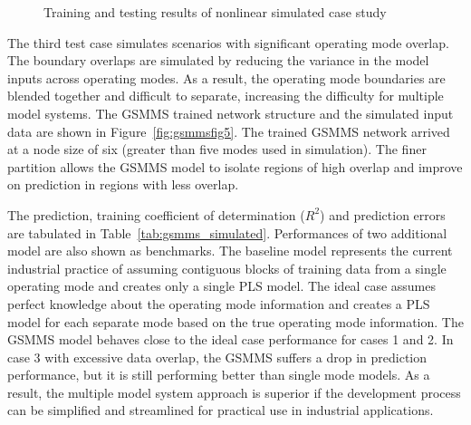 \documentclass[review,3p]{elsarticle}
\renewcommand\[{\begin{equation}}
\renewcommand\]{\end{equation}}
\begin{document}
\begin{figure}[htpb]
{    \label{fig:gsmmsfig4b}
  }
  \caption{Training and testing results of nonlinear simulated case study}
  \label{fig:gsmmsfig4}
\end{figure}

The third test case simulates scenarios with significant operating mode overlap.
The boundary overlaps are simulated by reducing the variance in the model inputs across operating modes.
As a result, the operating mode boundaries are blended together and difficult to separate, increasing the difficulty for multiple model systems. 
The GSMMS trained network structure and the simulated input data are shown in Figure~\ref{fig:gsmmsfig5}.
The trained GSMMS network arrived at a node size of six (greater than five modes used in simulation).
The finer partition allows the GSMMS model to isolate regions of high overlap and improve on prediction in regions with less overlap.

The prediction, training coefficient of determination ($R^2$) and prediction
errors are tabulated in Table~\ref{tab:gsmms_simulated}. Performances of two additional model are also shown as benchmarks. The baseline model represents the current industrial practice of assuming contiguous blocks of training data from a single operating mode and creates only a single PLS model.
The ideal case assumes perfect knowledge about the operating mode information and creates a PLS model for each separate mode based on the true operating mode information.
The GSMMS model behaves close to the ideal case performance for cases 1 and 2.
In case 3 with excessive data overlap, the GSMMS suffers a drop in prediction performance, but it is
still performing better than single mode models.
As a result, the multiple model system approach is superior if the development process can be
simplified and streamlined for practical use in industrial applications.
\end{document}
